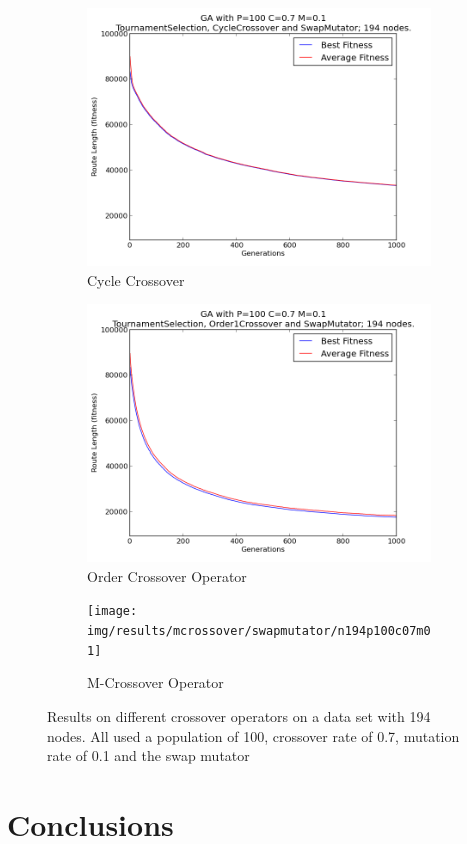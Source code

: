 \documentclass[10pt, a4paper]{article}
\begin{document}
\begin{figure}[h]
\centering
\begin{subfigure}[b]{0.67\textwidth}
\includegraphics[width=\textwidth]{img/results/cyclecrossover/swapmutator/n194p100c07m01}
\caption{Cycle Crossover}
\end{subfigure}

\begin{subfigure}[b]{0.67\textwidth}
\includegraphics[width=\textwidth]{img/results/order1crossover/swapmutator/n194p100c07m01}
\caption{Order Crossover Operator}
\end{subfigure}

\begin{subfigure}[b]{0.67\textwidth}
\texttt{[image: img/results/mcrossover/swapmutator/n194p100c07m01]}
\caption{M-Crossover Operator}
\end{subfigure}

\caption{Results on different crossover operators on a data set with 194 nodes.
         All used a population of 100, crossover rate of 0.7, mutation rate of 
         0.1 and the swap mutator}
\end{figure}

\section{Conclusions}




\end{document}
